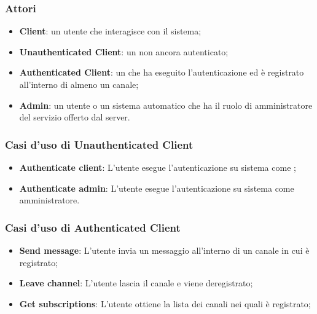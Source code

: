 		\subsubsection{Attori}
		\begin{itemize}
			\item \textbf{Client}: un utente che interagisce con il sistema;
			\item \textbf{Unauthenticated Client}: un  non ancora autenticato;
			\item \textbf{Authenticated Client}: un  che ha eseguito l'autenticazione ed è registrato all'interno di almeno un canale;
			\item \textbf{Admin}: un utente o un sistema automatico che ha il ruolo di amministratore del servizio offerto dal server.
		\end{itemize}

		\subsubsection{Casi d'uso di Unauthenticated Client}
		\begin{itemize}
			\item \textbf{Authenticate client}: L'utente esegue l'autenticazione su sistema come ;
			\item \textbf{Authenticate admin}: L'utente esegue l'autenticazione su sistema come amministratore.
		\end{itemize}

		\subsubsection{Casi d'uso di Authenticated Client}
		\begin{itemize}
			\item \textbf{Send message}: L'utente invia un messaggio all'interno di un canale in cui è registrato; 
			\item \textbf{Leave channel}: L'utente lascia il canale e viene deregistrato; 
			\item \textbf{Get subscriptions}: L'utente ottiene la lista dei canali nei quali è registrato; 
		\end{itemize}

